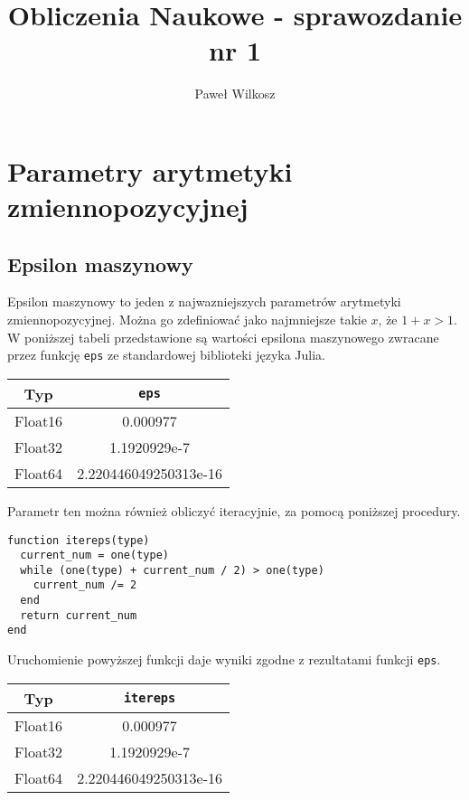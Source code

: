 \documentclass{article}
\author{Paweł Wilkosz}
\title{Obliczenia Naukowe - sprawozdanie nr 1}
\begin{document}
\maketitle

\section{Parametry arytmetyki zmiennopozycyjnej}

\subsection{Epsilon maszynowy}

Epsilon maszynowy to jeden z najwazniejszych parametrów arytmetyki zmiennopozycyjnej.
Można go zdefiniować jako najmniejsze takie $x$, że $1+x > 1$.
W poniższej tabeli przedstawione są wartości epsilona maszynowego zwracane przez funkcję \texttt{eps} ze standardowej biblioteki języka Julia.

\begin{center}
  \begin{tabular}{| c | c |}
    \hline
    Typ & \texttt{eps} \\
    \hline
    Float16 & 0.000977 \\
    Float32 & 1.1920929e-7 \\
    Float64 & 2.220446049250313e-16 \\
    \hline
  \end{tabular}
\end{center}

Parametr ten można również obliczyć iteracyjnie, za pomocą poniższej procedury.
\begin{lstlisting}
function itereps(type)
  current_num = one(type)
  while (one(type) + current_num / 2) > one(type)
    current_num /= 2
  end
  return current_num
end
\end{lstlisting}

Uruchomienie powyższej funkcji daje wyniki zgodne z rezultatami funkcji \texttt{eps}.
\begin{center}
  \begin{tabular}{| c | c |}
    \hline
    Typ & \texttt{itereps} \\
    \hline
    Float16 & 0.000977 \\
    Float32 & 1.1920929e-7 \\
    Float64 & 2.220446049250313e-16 \\
    \hline
  \end{tabular}
\end{center}
\end{document}
